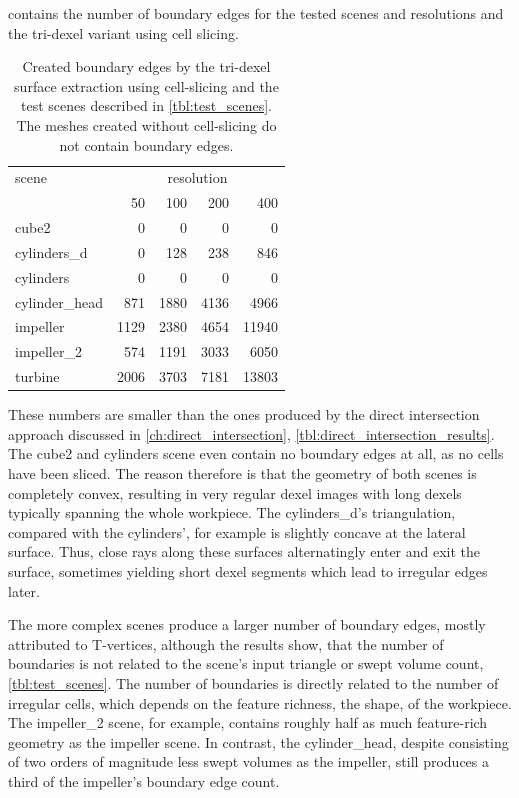  contains the number of boundary edges for the tested scenes and resolutions and the tri-dexel variant using cell slicing.
%
\begin{table}
	\centering
	\begin{tabular}{l|r|r|r|r}
		scene          & \multicolumn{4}{|c}{resolution} \\
		&   50 &  100 &  200 &   400 \\
		\midrule
		cube2          &    0 &    0 &    0 &     0 \\
		cylinders\_d   &    0 &  128 &  238 &   846 \\
		cylinders      &    0 &    0 &    0 &     0 \\
		cylinder\_head &  871 & 1880 & 4136 &  4966 \\
		impeller       & 1129 & 2380 & 4654 & 11940 \\
		impeller\_2    &  574 & 1191 & 3033 &  6050 \\
		turbine        & 2006 & 3703 & 7181 & 13803 \\
	\end{tabular}
	\caption{
		Created boundary edges by the tri-dexel surface extraction using cell-slicing and the test scenes described in \cref{tbl:test_scenes}.
		The meshes created without cell-slicing do not contain boundary edges.
	}
	\label{tbl:tri_dexel_boundary edges}
\end{table}
%
These numbers are smaller than the ones produced by the direct intersection approach discussed in \cref{ch:direct_intersection}, \cf \cref{tbl:direct_intersection_results}.
The cube2 and cylinders scene even contain no boundary edges at all, as no cells have been sliced.
The reason therefore is that the geometry of both scenes is completely convex, resulting in very regular dexel images with long dexels typically spanning the whole workpiece.
The cylinders\_d's triangulation, compared with the cylinders', for example is slightly concave at the lateral surface.
Thus, close rays along these surfaces alternatingly enter and exit the surface, sometimes yielding short dexel segments which lead to irregular edges later.

The more complex scenes produce a larger number of boundary edges, mostly attributed to T-vertices, although the results show, that the number of boundaries is not related to the scene's input triangle or swept volume count, \cf \cref{tbl:test_scenes}.
The number of boundaries is directly related to the number of irregular cells, which depends on the feature richness, \ie the shape, of the workpiece.
The impeller\_2 scene, for example, contains roughly half as much feature-rich geometry as the impeller scene.
In contrast, the cylinder\_head, despite consisting of two orders of magnitude less swept volumes as the impeller, still produces a third of the impeller's boundary edge count.

